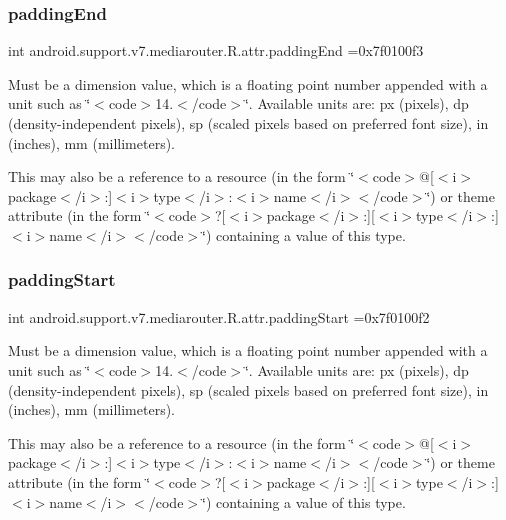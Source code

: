 \subsubsection{\texorpdfstring{padding\+End}{paddingEnd}}
{\footnotesize\ttfamily int android.\+support.\+v7.\+mediarouter.\+R.\+attr.\+padding\+End =0x7f0100f3\hspace{0.3cm}{\ttfamily [static]}}

Must be a dimension value, which is a floating point number appended with a unit such as \char`\"{}$<$code$>$14.\+5sp$<$/code$>$\char`\"{}. Available units are\+: px (pixels), dp (density-\/independent pixels), sp (scaled pixels based on preferred font size), in (inches), mm (millimeters). 

This may also be a reference to a resource (in the form \char`\"{}$<$code$>$@\mbox{[}$<$i$>$package$<$/i$>$\+:\mbox{]}$<$i$>$type$<$/i$>$\+:$<$i$>$name$<$/i$>$$<$/code$>$\char`\"{}) or theme attribute (in the form \char`\"{}$<$code$>$?\mbox{[}$<$i$>$package$<$/i$>$\+:\mbox{]}\mbox{[}$<$i$>$type$<$/i$>$\+:\mbox{]}$<$i$>$name$<$/i$>$$<$/code$>$\char`\"{}) containing a value of this type. \mbox{\label{classandroid_1_1support_1_1v7_1_1mediarouter_1_1R_1_1attr_a2f3d96d256743ab34d00d4423d23ea0f}} 
\subsubsection{\texorpdfstring{padding\+Start}{paddingStart}}
{\footnotesize\ttfamily int android.\+support.\+v7.\+mediarouter.\+R.\+attr.\+padding\+Start =0x7f0100f2\hspace{0.3cm}{\ttfamily [static]}}

Must be a dimension value, which is a floating point number appended with a unit such as \char`\"{}$<$code$>$14.\+5sp$<$/code$>$\char`\"{}. Available units are\+: px (pixels), dp (density-\/independent pixels), sp (scaled pixels based on preferred font size), in (inches), mm (millimeters). 

This may also be a reference to a resource (in the form \char`\"{}$<$code$>$@\mbox{[}$<$i$>$package$<$/i$>$\+:\mbox{]}$<$i$>$type$<$/i$>$\+:$<$i$>$name$<$/i$>$$<$/code$>$\char`\"{}) or theme attribute (in the form \char`\"{}$<$code$>$?\mbox{[}$<$i$>$package$<$/i$>$\+:\mbox{]}\mbox{[}$<$i$>$type$<$/i$>$\+:\mbox{]}$<$i$>$name$<$/i$>$$<$/code$>$\char`\"{}) containing a value of this type. \mbox{\label{classandroid_1_1support_1_1v7_1_1mediarouter_1_1R_1_1attr_a1d98e884dfa8884e0fb449668c534c55}} 

